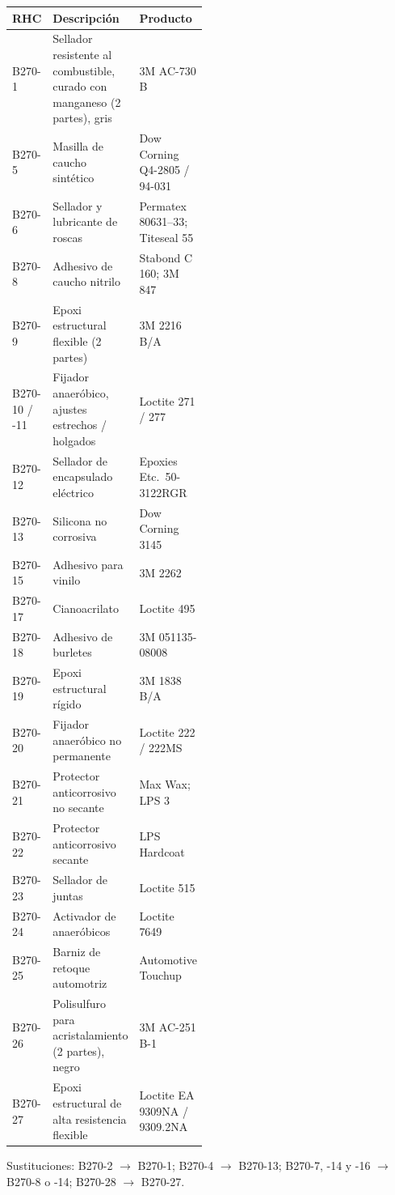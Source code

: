 \begin{center}
\small
\begin{tabularx}{\linewidth}{@{}l>{\raggedright\arraybackslash}p{0.48\linewidth}>{\raggedright\arraybackslash}X@{}}
\toprule
RHC & Descripción & Producto \\
\midrule
B270-1 & Sellador resistente al combustible, curado con manganeso (2 partes), gris & 3M AC-730 B \\
B270-5 & Masilla de caucho sintético & Dow Corning Q4-2805 / 94-031 \\
B270-6 & Sellador y lubricante de roscas & Permatex 80631--33; Titeseal 55 \\
B270-8 & Adhesivo de caucho nitrilo & Stabond C 160; 3M 847 \\
B270-9 & Epoxi estructural flexible (2 partes) & 3M 2216 B/A \\
B270-10 / -11 & Fijador anaeróbico, ajustes estrechos / holgados & Loctite 271 / 277 \\
B270-12 & Sellador de encapsulado eléctrico & Epoxies Etc.\ 50-3122RGR \\
B270-13 & Silicona no corrosiva & Dow Corning 3145 \\
B270-15 & Adhesivo para vinilo & 3M 2262 \\
B270-17 & Cianoacrilato & Loctite 495 \\
B270-18 & Adhesivo de burletes & 3M 051135-08008 \\
B270-19 & Epoxi estructural rígido & 3M 1838 B/A \\
B270-20 & Fijador anaeróbico no permanente & Loctite 222 / 222MS \\
B270-21 & Protector anticorrosivo no secante & Max Wax; LPS 3 \\
B270-22 & Protector anticorrosivo secante & LPS Hardcoat \\
B270-23 & Sellador de juntas & Loctite 515 \\
B270-24 & Activador de anaeróbicos & Loctite 7649 \\
B270-25 & Barniz de retoque automotriz & Automotive Touchup \\
B270-26 & Polisulfuro para acristalamiento (2 partes), negro & 3M AC-251 B-1 \\
B270-27 & Epoxi estructural de alta resistencia flexible & Loctite EA 9309NA / 9309.2NA \\
\bottomrule
\end{tabularx}
\end{center}

Sustituciones: B270-2 $\rightarrow$ B270-1; B270-4 $\rightarrow$ B270-13; B270-7, -14 y -16 $\rightarrow$ B270-8 o -14; B270-28 $\rightarrow$ B270-27.

